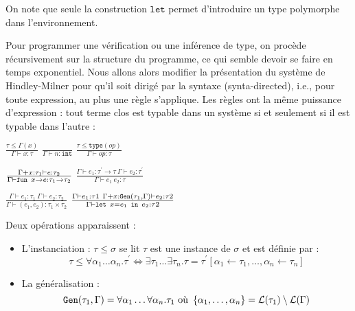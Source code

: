 \documentclass{cours}
\begin{document}
On note que seule la construction $\texttt{let}$ permet d'introduire un type polymorphe dans l'environnement.

Pour programmer une vérification ou une inférence de type, on procède récursivement sur la structure du programme, ce qui semble devoir se faire en temps exponentiel.
Nous allons alors modifier la présentation du système de Hindley-Milner pour qu'il soit dirigé par la syntaxe (synta-directed), i.e., pour toute expression, au plus une règle s'applique. Les règles ont la même puissance d'expression : tout terme clos est typable dans un système si et seulement si il est typable dans l'autre :

\begin{center}
    $\frac{\tau \leq \Gamma(x)}{\Gamma \vdash x : \tau}$
    $\frac{}{\Gamma \vdash n : \texttt{int}}$
    $\frac{\tau \leq \texttt{type}(op)}{\Gamma \vdash op : \tau}$
\end{center}
\begin{center}
    $\frac{\Gamma + x : \tau_{1} \vdash e : \tau_{2}}{\Gamma \vdash \texttt{fun } x \rightarrow e:\tau_{1}\rightarrow\tau_{2}}$
    $\frac{\Gamma \vdash e_{1} : \tau^{'}\rightarrow\tau \ \Gamma \vdash e_{2} : \tau^{'}}{\Gamma \vdash e_{1}\ e_{2} : \tau}$
\end{center}
\begin{center}
    $\frac{\Gamma \vdash e_{1} : \tau_{1} \ \Gamma \vdash e_{2} : \tau_{2}}{\Gamma \vdash (e_{1},e_{2}) : \tau_{1} \times \tau_{2}}$
    $\frac{\Gamma \vdash e_{1} : \tau{1} \ \Gamma + x : \texttt{Gen}(\tau_{1},  \Gamma) \vdash e_{2} : \tau{2}}{\Gamma \vdash \texttt{let } x = e_{1} \texttt{ in } e_{2} : \tau{2}}$
\end{center}

Deux opérations apparaissent :
\begin{itemize}
    \item L'instanciation : $\tau \leq \sigma$ se lit $\tau$ est une instance de $\sigma$ et est définie par :
          \[
              \tau \leq \forall\alpha_{1}\ldots\alpha_{n}.\tau^{'} \Leftrightarrow \exists\tau_{1}\ldots\exists\tau_{n}.\tau = \tau^{'}\left[\alpha_{1}\leftarrow\tau_{1}, \ldots, \alpha_{n} \leftarrow \tau_{n}\right]
          \]
    \item La généralisation :
          \[
              \texttt{Gen}(\tau_{1}, \Gamma) = \forall\alpha_{1}\ldots\forall\alpha_{n}.\tau_{1} \text{ où } \left\{\alpha_{1}, \ldots, \alpha_{n}\right\} = \mathcal{L}(\tau_{1}) \setminus \mathcal{L}(\Gamma)
          \]
\end{itemize}
\end{document}
